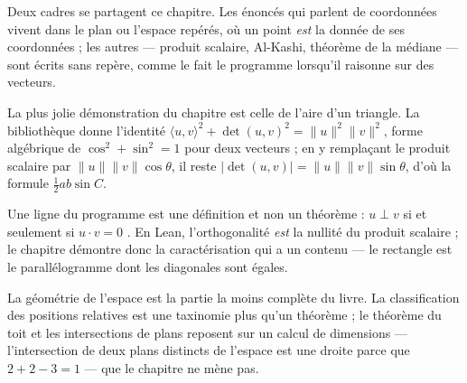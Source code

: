 Deux cadres se partagent ce chapitre. Les énoncés qui parlent de coordonnées vivent dans le
plan ou l'espace repérés, où un point \emph{est} la donnée de ses coordonnées ; les autres —
produit scalaire, Al-Kashi, théorème de la médiane — sont écrits sans repère, comme le fait le
programme lorsqu'il raisonne sur des vecteurs.

La plus jolie démonstration du chapitre est celle de l'aire d'un triangle. La bibliothèque
donne l'identité $\langle u, v\rangle^2 + \det(u,v)^2 = \|u\|^2\|v\|^2$, forme algébrique de
$\cos^2 + \sin^2 = 1$ pour deux vecteurs ; en y remplaçant le produit scalaire par
$\|u\|\|v\|\cos\theta$, il reste $|\det(u,v)| = \|u\|\|v\|\sin\theta$, d'où la formule
$\frac{1}{2}ab\sin C$.

Une ligne du programme est une définition et non un théorème : \og{} $u \perp v$ si et
seulement si $u \cdot v = 0$ \fg{}. En Lean, l'orthogonalité \emph{est} la nullité du produit
scalaire ; le chapitre démontre donc la caractérisation qui a un contenu — le rectangle est le
parallélogramme dont les diagonales sont égales.

La géométrie de l'espace est la partie la moins complète du livre. La classification des
positions relatives est une taxinomie plus qu'un théorème ; le théorème du toit et les
intersections de plans reposent sur un calcul de dimensions — l'intersection de deux plans
distincts de l'espace est une droite parce que $2 + 2 - 3 = 1$ — que le chapitre ne mène pas.
